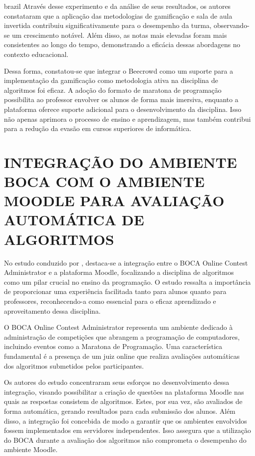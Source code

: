 \begin{otherlanguage*}{brazil}
Através desse experimento e da análise de seus resultados, os autores constataram que a aplicação das metodologias de gamificação e sala de aula invertida contribuiu significativamente para o desempenho da turma, observando-se um crescimento notável. Além disso, as notas mais elevadas foram mais consistentes ao longo do tempo, demonstrando a eficácia dessas abordagens no contexto educacional.

Dessa forma, constatou-se que integrar o Beecrowd como um suporte para a implementação da gamificação como metodologia ativa na disciplina de algoritmos foi eficaz. A adoção do formato de maratona de programação possibilita ao professor envolver os alunos de forma mais imersiva, enquanto a plataforma oferece suporte adicional para o desenvolvimento da disciplina. Isso não apenas aprimora o processo de ensino e aprendizagem, mas também contribui para a redução da evasão em cursos superiores de informática.



\section{INTEGRAÇÃO DO AMBIENTE BOCA COM O AMBIENTE MOODLE PARA AVALIAÇÃO AUTOMÁTICA DE ALGORITMOS}

No estudo conduzido por \cite{galasso}, destaca-se a integração entre o BOCA Online Contest Administrator e a plataforma Moodle, focalizando a disciplina de algoritmos como um pilar crucial no ensino da programação. O estudo ressalta a importância de proporcionar uma experiência facilitada tanto para alunos quanto para professores, reconhecendo-a como essencial para o eficaz aprendizado e aproveitamento dessa disciplina. 

O BOCA Online Contest Administrator representa um ambiente dedicado à administração de competições que abrangem a programação de computadores, incluindo eventos como a Maratona de Programação. Uma característica fundamental é a presença de um juiz online que realiza avaliações automáticas dos algoritmos submetidos pelos participantes. 

Os autores do estudo concentraram seus esforços no desenvolvimento dessa integração, visando possibilitar a criação de questões na plataforma Moodle nas quais as respostas consistem de algoritmos. Estes, por sua vez, são avaliados de forma automática, gerando resultados para cada submissão dos alunos. Além disso, a integração foi concebida de modo a garantir que os ambientes envolvidos fossem implementados em servidores independentes. Isso assegura que a utilização do BOCA durante a avaliação dos algoritmos não comprometa o desempenho do ambiente Moodle.


\end{otherlanguage*}

